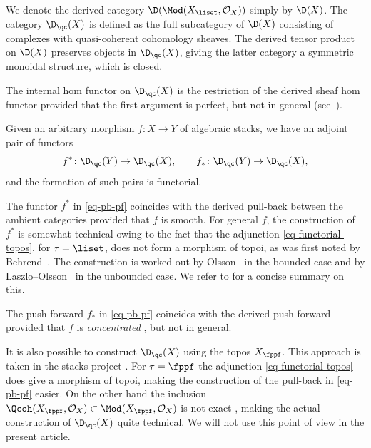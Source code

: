 We denote the derived category $\D(\Mod(X_\liset, \mathcal{O}_X))$ simply by $\D(X)$.
The category $\D_\qc(X)$ is defined as the full subcategory of $\D(X)$ consisting of
complexes with quasi-coherent cohomology sheaves.
The derived tensor product on $\D(X)$ preserves objects in $\D_\qc(X)$,
giving the latter category a symmetric monoidal structure, which is closed.
\begin{remark}
\label{rem-dqc-hom}
The internal hom functor on $\D_\qc(X)$ is the restriction of the derived sheaf hom functor provided
that the first argument is perfect, but not in general
(see~\cite[Section~1.2]{hr2017}). 
\end{remark}
Given an arbitrary morphism $f\colon X \to Y$ of algebraic stacks,
we have an adjoint pair of functors
\begin{equation}
\label{eq-pb-pf}
f^*\colon \D_\qc(Y) \to \D_\qc(X), \qquad f_*\colon \D_\qc(Y) \to \D_\qc(X),
\end{equation}
and the formation of such pairs is functorial.
\begin{remark}
\label{rem-derived-pb}
The functor $f^*$ in \eqref{eq-pb-pf} coincides with the derived pull-back between the ambient categories provided that
$f$ is smooth.
For general $f$, the construction of $f^*$ is somewhat technical owing to the fact that the adjunction
\eqref{eq-functorial-topos}, for $\tau = \liset$,
does not form a morphism of topoi,
as was first noted by Behrend~\cite[Warning~5.3.12]{behrend-derived-l-adic-stacks}.
The construction is worked out by Olsson~\cite{olsson2007} in the bounded case and by Laszlo--Olsson~\cite[Example~2.2.5]{lo2008} in the unbounded case.
We refer to \cite[Section~1]{hr2017} for a concise summary on this.
\end{remark}
\begin{remark}
\label{rem-derived-pf}
The push-forward $f_*$ in \eqref{eq-pb-pf} coincides with the derived push-forward provided that
$f$ is \emph{concentrated} \cite[Definition~2.4, Theorem~2.6(2)]{hr2017},
but not in general.
\end{remark}

\begin{remark}
It is also possible to construct $\D_\qc(X)$ using the topos $X_\fppf$.
This approach is taken in the stacks project \cite[]{stacks-project}.
For $\tau = \fppf$ the adjunction \eqref{eq-functorial-topos} does give a morphism of topoi,
making the construction of the pull-back in \eqref{eq-pb-pf} easier.
On the other hand the inclusion $\Qcoh(X_\fppf, \mathcal{O}_X) \subset \Mod(X_\fppf, \mathcal{O}_X)$
is not exact \cite[]{stacks-project},
making the actual construction of $\D_\qc(X)$ quite technical.
We will not use this point of view in the present article.
\end{remark}

